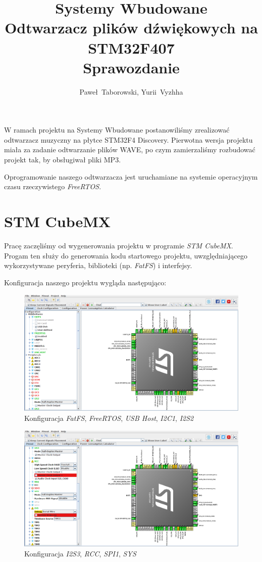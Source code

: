 \documentclass[12pt,a4paper]{article}
\author{Paweł~Taborowski, Yurii~Vyzhha}
\title{Systemy Wbudowane \\Odtwarzacz plików dźwiękowych na STM32F407\\Sprawozdanie}
\begin{document}
  \maketitle
W ramach projektu na Systemy Wbudowane postanowiliśmy zrealizować odtwarzacz muzyczny na płytce  STM32F4 Discovery. Pierwotna wersja projektu miała za zadanie odtwarzanie plików WAVE, po czym zamierzaliśmy rozbudować projekt tak, by obsługiwał pliki MP3.

Oprogramowanie naszego odtwarzacza jest uruchamiane na systemie operacyjnym czasu rzeczywistego \textit{FreeRTOS}.

\section{STM CubeMX}
Pracę zaczęliśmy od wygenerowania projektu w programie \emph{STM CubeMX}. Progam ten służy do generowania kodu startowego projektu, uwzględniającego wykorzystywane peryferia, biblioteki (np. \textit{FatFS}) i interfejsy.

Konfiguracja naszego projektu wygląda następująco:

\begin{figure}[H]
 \centerline{\includegraphics[width=\textwidth]{img/img1}}
 \caption{Konfiguracja \emph{FatFS}, \emph{FreeRTOS}, \emph{USB Host}, \emph{I2C1}, \emph{I2S2}}
 \label{img1}
\end{figure}

\begin{figure}[H]
 \centerline{\includegraphics[width=\textwidth]{img/img2}}
 \caption{Konfiguracja \emph{I2S3}, \emph{RCC}, \emph{SPI1}, \emph{SYS}}
 \label{img2}
\end{figure}
\end{document}
